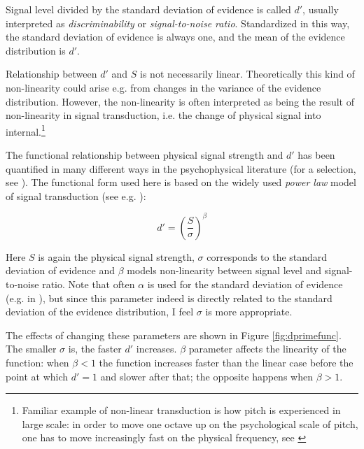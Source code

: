 \documentclass{article}\usepackage{knitr}
\begin{document}
Signal level divided by the standard deviation of evidence is called $d'$, usually interpreted as \textit{discriminability} or \textit{signal-to-noise ratio}. Standardized in this way, the standard deviation of evidence is always one, and the mean of the evidence distribution is $d'$. 

Relationship between $d'$ and $S$ is not necessarily linear. Theoretically this kind of non-linearity could  arise e.g. from changes in the variance of the evidence distribution. However, the non-linearity is often interpreted as being the result of non-linearity in signal transduction, i.e. the change of physical signal into internal.\footnote{Familiar example of non-linear transduction is how pitch is experienced in large scale: in order to move one octave up on the psychological scale of pitch, one has to move increasingly fast on the physical frequency, see \citet[Chapter 5]{zwickerfastl}}

The functional relationship between physical signal strength and $d'$ has been quantified in many different ways in the psychophysical literature (for a selection, see \citet[Appendix A]{lesmes2015}). The functional form used here is based on the widely used \textit{power law} model of signal transduction (see e.g. \citet{kontsevichtyler1999, dai2011, lesmes2015}):

\begin{equation}
d' = (\frac{S}{\sigma})^\beta
\label{eq:dprimefunc}
\end{equation}

Here $S$ is again the physical signal strength, $\sigma$ corresponds to the standard deviation of evidence and $\beta$ models non-linearity between signal level and signal-to-noise ratio. Note that often $\alpha$ is used for the standard deviation of evidence (e.g. in \cite{dai2011, kontsevichtyler1999}), but since this parameter indeed is directly related to the standard deviation of the evidence distribution, I feel $\sigma$ is more appropriate. 

The effects of changing these parameters are shown in Figure \ref{fig:dprimefunc}. The smaller $\sigma$ is, the faster $d'$ increases. $\beta$ parameter affects the linearity of the function: when $\beta < 1$ the function increases faster than the linear case before the point at which $d' = 1$ and slower after that; the opposite happens when $\beta > 1$. 
\end{document}
